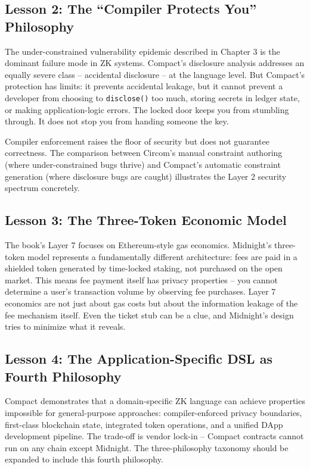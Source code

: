 \documentclass[
  11pt,
  openany]{report}
\begin{document}
\subsection{Lesson 2: The ``Compiler Protects You''
Philosophy}\label{lesson-2-the-compiler-protects-you-philosophy}

The under-constrained vulnerability epidemic described in Chapter 3 is the
dominant failure mode in ZK systems. Compact's disclosure analysis addresses an
equally severe class -- accidental disclosure -- at the language level. But
Compact's protection has limits: it prevents accidental leakage, but it cannot
prevent a developer from choosing to \texttt{disclose()} too much, storing
secrets in ledger state, or making application-logic errors. The locked door
keeps you from stumbling through. It does not stop you from handing someone the
key.

Compiler enforcement raises the floor of security but does not guarantee
correctness. The comparison between Circom's manual constraint authoring (where
under-constrained bugs thrive) and Compact's automatic constraint generation
(where disclosure bugs are caught) illustrates the Layer 2 security spectrum
concretely.

\subsection{Lesson 3: The Three-Token Economic
Model}\label{lesson-3-the-three-token-economic-model}

The book's Layer 7 focuses on Ethereum-style gas economics. Midnight's
three-token model represents a fundamentally different architecture: fees are
paid in a shielded token generated by time-locked staking, not purchased on the
open market. This means fee payment itself has privacy properties -- you cannot
determine a user's transaction volume by observing fee purchases. Layer 7
economics are not just about gas costs but about the information leakage of the
fee mechanism itself. Even the ticket stub can be a clue, and Midnight's design
tries to minimize what it reveals.

\subsection{Lesson 4: The Application-Specific DSL as Fourth
Philosophy}\label{lesson-4-the-application-specific-dsl-as-fourth-philosophy}

Compact demonstrates that a domain-specific ZK language can achieve properties
impossible for general-purpose approaches: compiler-enforced privacy boundaries,
first-class blockchain state, integrated token operations, and a unified DApp
development pipeline. The trade-off is vendor lock-in -- Compact contracts
cannot run on any chain except Midnight. The three-philosophy taxonomy should be
expanded to include this fourth philosophy.
\end{document}
